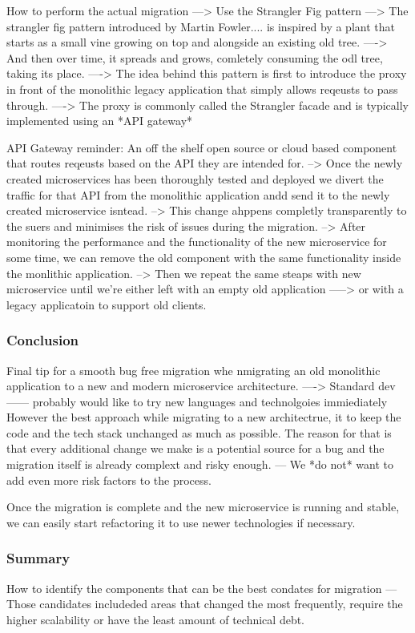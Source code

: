 \documentclass[a4paper, 11pt]{book}
\begin{document}
    How to perform the actual migration
    ---> Use the Strangler Fig pattern
    ---> The strangler fig pattern introduced by Martin Fowler.... is inspired by a plant that starts as a small vine growing on top and alongside an existing old tree.
    ----> And then over time, it spreads and grows, comletely consuming the odl tree, taking its place.
    ----> The idea behind this pattern is first to introduce the proxy in front of the monolithic legacy application that simply allows reqeusts to pass through.
    ----> The proxy is commonly called the Strangler facade and is typically implemented using an *API gateway*

    API Gateway reminder: An off the shelf open source or cloud based component that routes reqeusts based on the API they are intended for.
    --> Once the newly created microservices has been thoroughly tested and deployed we divert the traffic for that API from the monolithic application andd send it to the newly created microservice isntead.
    --> This change ahppens completly transparently to the suers and minimises the risk of issues during the migration.
    --> After monitoring the performance and the functionality of the new microservice for some time, we can remove the old component with the same functionality inside the monlithic application.
    --> Then we repeat the same steaps with new microservice until we're either left with an empty old application
    -----> or with a legacy applicatoin to support old clients.

    \subsubsection{Conclusion}
    Final tip for a smooth bug free migration whe nmigrating an old monolithic application to a new and modern microservice architecture.
    ----> Standard dev------ probably would like to try new languages and technolgoies immiediately
    However the best approach while migrating to a new architectrue, it to keep the code and the tech stack unchanged as much as possible.
    The reason for that is that every additional change we make is a potential source for a bug and the migration itself is already complext and risky enough.
    --- We *do not* want to add even more risk factors to the process.

    Once the migration is complete and the new microservice is running and stable, we can easily start refactoring it to use newer technologies if necessary.

    \subsubsection{Summary}
    How to identify the components that can be the best condates for migration
    --- Those candidates includeded areas that changed the most frequently, require the higher scalability or have the least amount of technical debt.
\end{document}
